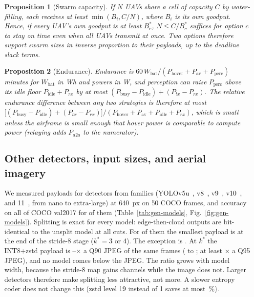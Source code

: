 \documentclass[journal,twocolumn,10pt]{IEEEtran}
\newtheorem{proposition}{Proposition}
\begin{document}
\begin{proposition}[Swarm capacity]\label{prop:swarm}
If $N$ UAVs share a cell of capacity $C$ by water-filling, each receives at least $\min(B_i,C/N)$, where $B_i$ is its own goodput. Hence, if every UAV's own goodput is at least $B^\ast_c$, $N\le C/B^\ast_c$ suffices for option $c$ to stay on time even when all UAVs transmit at once. Two options therefore support swarm sizes in inverse proportion to their payloads, up to the deadline slack terms.
\end{proposition}

\begin{proposition}[Endurance]\label{prop:energy}
Endurance is $60\,W_{\mathrm{bat}}/(P_{\mathrm{hover}}+P_{\mathrm{av}}+P_{\mathrm{perc}})$ minutes for $W_{\mathrm{bat}}$ in Wh and powers in W, and perception can raise $P_{\mathrm{perc}}$ above its idle floor $P_{\mathrm{idle}}+P_{rx}$ by at most $(P_{\mathrm{busy}}-P_{\mathrm{idle}})+(P_{tx}-P_{rx})$. The relative endurance difference between any two strategies is therefore at most $\big[(P_{\mathrm{busy}}-P_{\mathrm{idle}})+(P_{tx}-P_{rx})\big]/(P_{\mathrm{hover}}+P_{\mathrm{av}}+P_{\mathrm{idle}}+P_{rx})$, which is small unless the airframe is small enough that hover power is comparable to compute power (relaying adds $P_{a2a}$ to the numerator).
\end{proposition}

\subsection{Other detectors, input sizes, and aerial imagery}\label{sec:gen-models}
We measured payloads for \GenNModels{} detectors from \GenNFamilies{} families (YOLOv5u~\cite{jocher2020yolov5}, v8~\cite{jocher2023yolo}, v9~\cite{wang2024yolov9}, v10~\cite{wang2024yolov10}, and 11~\cite{jocher2024yolo11}, from nano to extra-large) at 640~px on 50 COCO frames, and accuracy on all of COCO val2017 for \GenNAccModels{} of them (Table~\ref{tab:gen-models}, Fig.~\ref{fig:gen-models}). Splitting is exact for every model: edge-then-cloud outputs are bit-identical to the unsplit model at all \GenTotalCutsChecked{} cuts. For \GenNStrideEightBottleneck{} of them the smallest payload is at the end of the stride-8 stage ($k^\ast=3$ or 4). The exception is \GenOddBottleneck. At $k^\ast$ the INT8+zstd payload is \GenRatioMin--\GenRatioMax$\times$ a Q90 JPEG of the same frames (\GenRatioMinModel{} to \GenRatioMaxModel{}; at least \GenRatioNinetyFiveMin$\times$ a Q95 JPEG), and no model comes below the JPEG. The ratio grows with model width, because the stride-8 map gains channels while the image does not. Larger detectors therefore make splitting less attractive, not more. A slower entropy coder does not change this (zstd level 19 instead of 1 saves at most \GenZstdNineteenGainMax\,\%).
\end{document}
